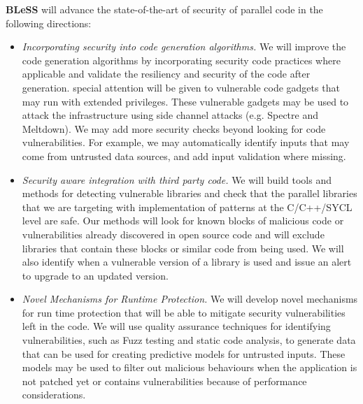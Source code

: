 \documentclass[a4paper,11pt]{article}
\newcommand{\project}[1]{\textbf{#1}\xspace}
\newcommand{\BLESS}{\project{BLeSS}}
\newcommand{\TheProject}{\BLESS}
\begin{document}
\TheProject{} will advance the state-of-the-art of security of parallel code in the following directions:
\begin{itemize}
\item \emph{Incorporating security into code generation algorithms.} We will improve the code generation algorithms
  by incorporating security code practices where applicable and validate the resiliency and security of the
  code after generation. special attention will be given to vulnerable code gadgets that may run with extended privileges. These vulnerable
gadgets may be used to attack the infrastructure using side channel attacks (e.g. Spectre and Meltdown). We may add more
  security checks beyond looking for code vulnerabilities. For example, we may automatically identify inputs
  that may come from untrusted data sources, and add input validation where missing.
\item \emph{Security aware integration with third party code.} We will build tools and methods for detecting
  vulnerable libraries and check that the parallel libraries that we are targeting with implementation of patterns at the C/C++/SYCL level
  are safe. Our methods will look for known blocks of malicious code or vulnerabilities already discovered
  in open source code and will exclude libraries that contain these blocks or similar code from being used.  We will also identify when
a vulnerable version of a library is used and issue an alert to upgrade to an updated version.
\item \emph{Novel Mechanisms for Runtime Protection.} We will develop novel mechanisms for run time protection
  that will be able to mitigate security vulnerabilities left in the code. We will use quality assurance techniques
  for identifying vulnerabilities, such as Fuzz testing and static code analysis, to generate data that can be
  used for creating predictive models for untrusted inputs. These models may be used to filter out malicious behaviours
  when the application is not patched yet or contains vulnerabilities because of performance considerations.
\end{itemize}
\end{document}
